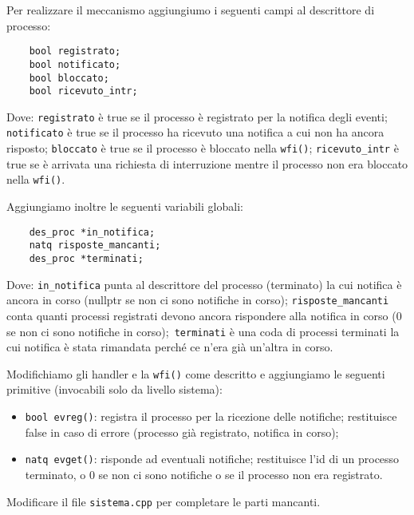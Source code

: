 Per realizzare il meccanismo aggiungiumo i seguenti campi al descrittore di processo:
\begin{verbatim}
    bool registrato;
    bool notificato;
    bool bloccato;
    bool ricevuto_intr;
\end{verbatim}
Dove: \verb|registrato| \`e true se il processo \`e registrato per la notifica degli eventi;
\verb|notificato| \`e true se il processo ha ricevuto una notifica a cui non ha ancora risposto;
\verb|bloccato| \`e true se il processo \`e bloccato nella \verb|wfi()|;
\verb|ricevuto_intr| \`e true se \`e arrivata una richiesta di interruzione mentre il processo non
era bloccato nella \verb|wfi()|.

Aggiungiamo inoltre le seguenti variabili globali:
\begin{verbatim}
    des_proc *in_notifica;
    natq risposte_mancanti;
    des_proc *terminati;
\end{verbatim}
Dove: \verb|in_notifica| punta al descrittore del processo (terminato) la cui notifica \`e
ancora in corso (nullptr se non ci sono notifiche in corso);
\verb|risposte_mancanti| conta quanti processi registrati devono ancora rispondere alla
notifica in corso (0 se non ci sono notifiche in corso);\
\verb|terminati| \`e una coda di processi terminati la cui notifica \`e stata rimandata
perch\'e ce n'era gi\`a un'altra in corso.

Modifichiamo gli handler e la \verb|wfi()| come descritto e aggiungiamo le seguenti primitive (invocabili solo da livello sistema):
\begin{itemize}
  \item \verb|bool evreg()|: registra il processo per la ricezione delle notifiche; restituisce
  false in caso di errore (processo gi\`a registrato, notifica in corso);
  \item \verb|natq evget()|: risponde ad eventuali notifiche; restituisce l'id di un processo terminato,
  o 0 se non ci sono notifiche o se il processo non era registrato.
\end{itemize}
Modificare il file \verb|sistema.cpp| per completare le parti mancanti.
